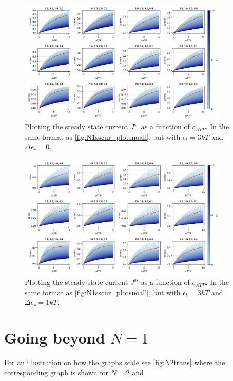 \documentclass[11pt]{article}
\begin{document}
\begin{figure}[H]
	\centering
	\includegraphics[width=0.9\textwidth]{../../plots/N1sym/sscurs_et=3_der=0.png}
	\caption{
		Plotting the steady state current $J^\text{ss}$ as a function of $c_{ATP}$.
		In the same format as \cref{fig:N1sscur_plotsnoall}, but with $\epsilon_t=3\si{k}T$ and $\Delta\epsilon_r=0$.
	}\label{fig:N1sscur_plots2}
\end{figure}

\begin{figure}[H]
	\centering
	\includegraphics[width=0.9\textwidth]{../../plots/N1sym/sscurs_et=3_der=1.png}
	\caption{
		Plotting the steady state current $J^\text{ss}$ as a function of $c_{ATP}$.
		In the same format as \cref{fig:N1sscur_plotsnoall}, but with $\epsilon_t=3\si{k}T$ and $\Delta\epsilon_r=1\si{k}T$.
	}\label{fig:N1sscur_plots3}
\end{figure}



\newpage
\section{Going beyond $N=1$}
For an illustration on how the graphs scale see \cref{fig:N2trans} where the corresponding graph is shown for $N=2$ and
\end{document}
